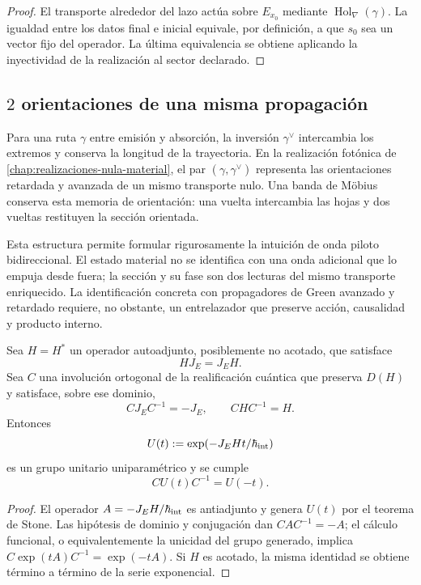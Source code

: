 \begin{proof}
El transporte alrededor del lazo actúa sobre \(E_{x_0}\) mediante
\(\operatorname{Hol}_{\nabla}(\gamma)\). La igualdad entre los datos final
e inicial equivale, por definición, a que \(s_0\) sea un vector fijo del
operador. La última equivalencia se obtiene aplicando la inyectividad de la
realización al sector declarado.
\end{proof}

\subsection{\(2\) orientaciones de una misma propagación}

Para una ruta \(\gamma\) entre emisión y absorción, la inversión
\(\gamma^\vee\) intercambia los extremos y conserva la longitud de la
trayectoria. En la realización fotónica de
\cref{chap:realizaciones-nula-material}, el par
\((\gamma,\gamma^\vee)\) representa las orientaciones retardada y avanzada
de un mismo transporte nulo. Una banda de Möbius conserva esta memoria de
orientación: una vuelta intercambia las hojas y dos vueltas restituyen la
sección orientada.

Esta estructura permite formular rigurosamente la intuición de onda piloto
bidireccional. El estado material no se identifica con una onda adicional
que lo empuja desde fuera; la sección y su fase son dos lecturas del mismo
transporte enriquecido. La identificación concreta con propagadores de Green
avanzado y retardado requiere, no obstante, un entrelazador que preserve
acción, causalidad y producto interno.

\begin{proposition}
\label{prop:conjugacion-propagador-bidireccional-rev2}
Sea \(H=H^*\) un operador autoadjunto, posiblemente no acotado, que satisface
\[
 HJ_E=J_EH.
\]
Sea \(C\) una involución ortogonal de la realificación cuántica que preserva
\(D(H)\) y satisface, sobre ese dominio,
\[
 CJ_EC^{-1}=-J_E,
 \qquad CHC^{-1}=H.
\]
Entonces
\[
 U(t):=\exp(-J_EHt/\hbar_{\rm int})
\]
es un grupo unitario uniparamétrico y se cumple
\[
 \boxed{CU(t)C^{-1}=U(-t)}.
\]
\end{proposition}

\begin{proof}
El operador \(A=-J_EH/\hbar_{\rm int}\) es antiadjunto y genera \(U(t)\)
por el teorema de Stone. Las hipótesis de dominio y conjugación dan
\(CAC^{-1}=-A\); el cálculo funcional, o equivalentemente la unicidad del
grupo generado, implica
\(C\exp(tA)C^{-1}=\exp(-tA)\). Si \(H\) es acotado, la misma identidad se
obtiene término a término de la serie exponencial.
\end{proof}

